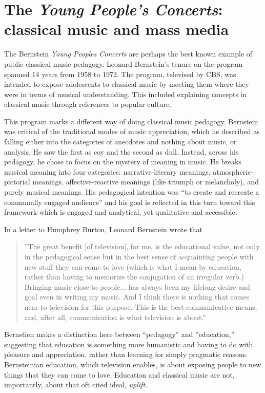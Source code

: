 \documentclass[12pt,letterpaper]{article}
\begin{document}
		
	\section*{The \textit{Young People's Concerts}: classical music and 
	mass media}

	\noindent The Bernstein \textit{Young Peoples Concerts} are perhaps the
	best known example of public classical music pedagogy. Leonard 
	Bernstein's tenure
	on the program spanned 14 years from 1958 to 1972. The program, televised by
	CBS, was intended to expose adolescents to classical music by meeting 
	them where they were in terms of musical understanding. This included  
	explaining concepts in classical music through references to popular 
	culture.    

	This program marks a different way of doing classical 
	music
	pedagogy. Bernstein was critical of the traditional modes of music 
	appreciation, which he described as falling either into the categories 
	of anecdotes and nothing about music, or analysis. He saw the first as 
	coy and
	the second as dull. Instead, across his pedagogy, he chose to focus on 
	the mystery of meaning in music. He breaks musical meaning into four 
	categories: narrative-literary meanings, atmospheric-pictorial meanings,
	affective-reactive meanings (like triumph or melancholy), and purely 
	musical meanings.\autocite[14]{Kopfstein}  His pedagogical intention 
	was ``to create and recreate a communally engaged 
	audience''\autocite[51]{Kopfstein} and his goal is reflected in this
	turn toward this framework which is engaged and analytical, yet 
	qualitative and accessible.  
 	
	In a letter to Humphrey Burton, Leonard Bernstein wrote that 

	\begin{quote}
	''The great
	benefit [of television], for me, is the educational value, not only in 
	the pedagogical sense but in the best sense of acquainting people with 
	new stuff they can come to love (which is what I mean by education, 
	rather than having to memorize the conjugation of an irregular verb.) 
	Bringing music close to people... has always been my lifelong desire and
	goal even in writing my music. And I think there is nothing that comes 
	near to television for this purpose. This is the best communicative 
	means, and, after all, communication is what television is 
	about.''\autocite[71]{Kopfstein}
	\end{quote}

	Bernstien makes a distinction here between ``pedagogy'' and 
	''education,'' suggesting that education is something more humanistic 
	and having to do with pleasure and appreciation, rather than learning 
	for simply pragmatic reasons. Bernsteinian education, which television 
	enables, is about exposing people to new things that they can come to 
	love. Education and classical music are not, importantly, about 
	that oft cited ideal, \textit{uplift.} 
\end{document}
